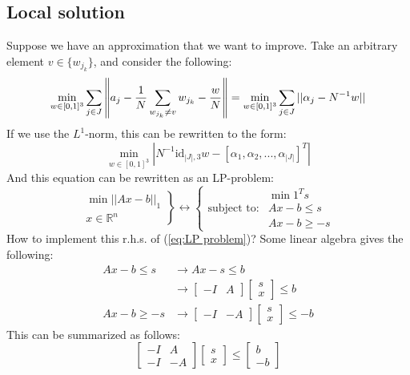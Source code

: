\documentclass[10pt,a4paper]{article}
\newcommand{\R}{\mathbb{R}}
\begin{document}
	\subsection*{Local solution}
	Suppose we have an approximation that we want to improve.
	Take an arbitrary element $v \in \{ w_{j_k} \}$, and consider the following:
	\begin{equation*}
	\min_{w \in [0,1]^3} \sum_{j \in J} \left\lVert a_j - {1 \over N} \sum_{w_{j_k} \neq v} w_{j_k} - {w \over N} \right\rVert = \min_{w \in [0,1]^3} \sum_{j \in J} ||\alpha_j - N^{-1} w||
	\end{equation*}
	If we use the $L^1$-norm, this can be rewritten to the form:
	\begin{equation*}
	\min_{w \in [0,1]^3} |N^{-1}\text{id}_{|J|,3} w - [\alpha_1, \alpha_2, ..., \alpha_{|J|}]^T|
	\end{equation*}
	And this equation can be rewritten as an LP-problem:
	\begin{equation}
	\left. \begin{matrix}
	\min ||Ax - b||_1\\
	x \in \R^n
	\end{matrix} \right\} 
	\longleftrightarrow 
	\left\{ \begin{matrix}
	&\min 1^T s\\
	\text{subject to:}& Ax - b \leq s\\
	&Ax-b \geq -s
	\end{matrix}\right.
	\label{eq:LP problem}
	\end{equation}
	How to implement this r.h.s. of (\ref{eq:LP problem})?
	Some linear algebra gives the following:
	\begin{align*}
	Ax - b \leq s &\longrightarrow Ax - s \leq b \\
	&\longrightarrow \begin{bmatrix}-I & A\end{bmatrix} \begin{bmatrix}s\\ x\end{bmatrix} \leq b\\
	Ax - b \geq -s &\longrightarrow \begin{bmatrix}-I & -A\end{bmatrix} \begin{bmatrix}s\\ x\end{bmatrix} \leq -b
	\end{align*}
	This can be summarized as follows:
	\begin{equation}
	\begin{bmatrix}
	-I & A\\
	-I & -A
	\end{bmatrix} 
	\begin{bmatrix}
	s\\ x
	\end{bmatrix} \leq 
	\begin{bmatrix}
	b\\
	-b
	\end{bmatrix}
	\end{equation}
\end{document}
